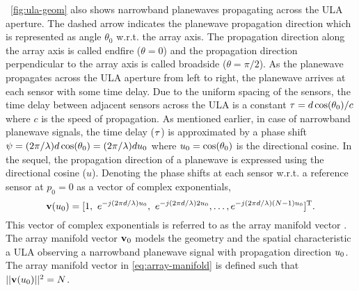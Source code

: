 
\figurename{}~\ref{fig:ula-geom} also shows narrowband planewaves
propagating across the ULA aperture. The dashed arrow indicates the
planewave propagation direction which is represented as angle
$\theta_0$ w.r.t. the array axis. The propagation direction along the
array axis is called endfire ($\theta = 0$) and the propagation
direction perpendicular to the array axis is called broadside
($\theta = \pi/2$). As the planewave propagates across the ULA
aperture from left to right, the planewave arrives at each sensor with
some time delay. Due to the uniform spacing of the sensors, the time
delay between adjacent sensors across the ULA is a constant
$\tau = d\cos(\theta_0)/c$ where $c$ is the speed of propagation. As
mentioned earlier, in case of narrowband planewave signals, the time
delay ($\tau$) is approximated by a phase shift
$\psi = (2\pi/\lambda)d\cos(\theta_0) = (2\pi/\lambda)du_0$ where
$u_0 = \cos(\theta_0)$ is the directional cosine. In the sequel, the
propagation direction of a planewave is expressed using the
directional cosine ($u$). Denoting the phase shifts at each sensor
w.r.t. a reference sensor at $p_0 = 0$ as a vector of complex
exponentials,
\begin{equation}
\label{eq:array-manifold}
  {\bf v}(u_0) = [1,~e^{-j{(2\pi d/\lambda)}  u_0},~ e^{-j{(2\pi d/\lambda)}2 u_0},
\ldots, e^{-j{(2\pi d/\lambda)}(N-1)  u_0}]^\text{T}.
\end{equation}
This vector of complex exponentials is referred to as the array
manifold vector \cite{vtree2002oap}. The array manifold vector
${\bf v}_0$ models the geometry and the spatial characteristic a ULA
observing a narrowband planewave signal with propagation direction
$u_0$. The array manifold vector in \eqref{eq:array-manifold} is
defined such that $||{\bf v}(u_0)||^2 = N$.

